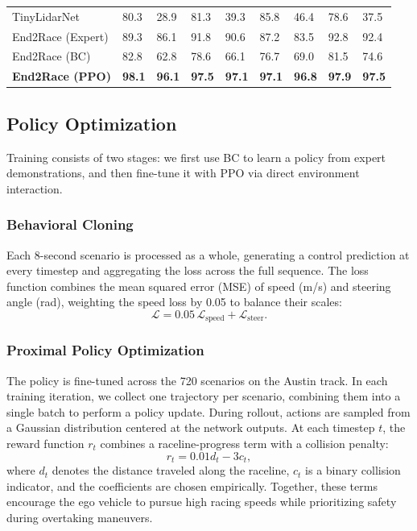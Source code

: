 \documentclass[letterpaper,10 pt,conference]{ieeeconf}
\begin{document}
\begin{table}[!t]
\begin{tabularx}{\textwidth}{>{\raggedright\arraybackslash}p{2.8cm}|YY|YY|YY|YY}
\hline
TinyLidarNet~\cite{zarrar2024tinylidarnet} & 80.3 & 28.9 & 81.3 & 39.3 & 85.8 & 46.4 & 78.6 & 37.5 \\
End2Race (Expert) & 89.3 & 86.1 & 91.8 & 90.6 & 87.2 & 83.5 & 92.8 & 92.4 \\
End2Race (BC) & 82.8 & 62.8 & 78.6 & 66.1 & 76.7 & 69.0 & 81.5 & 74.6 \\
\textbf{End2Race (PPO)} & \textbf{98.1} & \textbf{96.1} & \textbf{97.5} & \textbf{97.1} & \textbf{97.1} & \textbf{96.8} & \textbf{97.9} & \textbf{97.5} \\
\hline
\end{tabularx}
\label{tab:head_to_head}
\end{table}

\subsection{Policy Optimization}
\label{sec:policy-training}

Training consists of two stages: we first use BC to learn a policy from expert demonstrations, and then fine-tune it with PPO via direct environment interaction.

\subsubsection{Behavioral Cloning}
\label{sec:behavioral-cloning}

Each 8-second scenario is processed as a whole, generating a control prediction at every timestep and aggregating the loss across the full sequence. The loss function combines the mean squared error (MSE) of speed (m/s) and steering angle (rad), weighting the speed loss by 0.05 to balance their scales:
\begin{equation}
\mathcal{L} = 0.05\, \mathcal{L}_{\text{speed}} + \mathcal{L}_{\text{steer}}.
\end{equation}

\subsubsection{Proximal Policy Optimization}
\label{sec:rl-finetuning}

The policy is fine-tuned across the 720 scenarios on the Austin track. In each training iteration, we collect one trajectory per scenario, combining them into a single batch to perform a policy update. During rollout, actions are sampled from a Gaussian distribution centered at the network outputs. At each timestep $t$, the reward function $r_t$ combines a raceline-progress term with a collision penalty:
\begin{equation}
r_t = 0.01d_t - 3c_t,
\end{equation}
where \(d_t\) denotes the distance traveled along the raceline, \(c_t\) is a binary collision indicator, and the coefficients are chosen empirically. Together, these terms encourage the ego vehicle to pursue high racing speeds while prioritizing safety during overtaking maneuvers.
\end{document}
